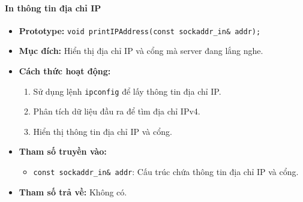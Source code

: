 \paragraph{\textbf{In thông tin địa chỉ IP}}
\begin{itemize}
    \item \textbf{Prototype:} \texttt{void printIPAddress(const sockaddr\_in\& addr);}
    
    \item \textbf{Mục đích:} Hiển thị địa chỉ IP và cổng mà server đang lắng nghe.
    
    \item \textbf{Cách thức hoạt động:} 
    \begin{enumerate}
        \item Sử dụng lệnh \texttt{ipconfig} để lấy thông tin địa chỉ IP.
        \item Phân tích dữ liệu đầu ra để tìm địa chỉ IPv4.
        \item Hiển thị thông tin địa chỉ IP và cổng.
    \end{enumerate}
    
    \item \textbf{Tham số truyền vào:} 
    \begin{itemize}
        \item \texttt{const sockaddr\_in\& addr}: Cấu trúc chứa thông tin địa chỉ IP và cổng.
    \end{itemize}
    
    \item \textbf{Tham số trả về:} Không có.
\end{itemize}

